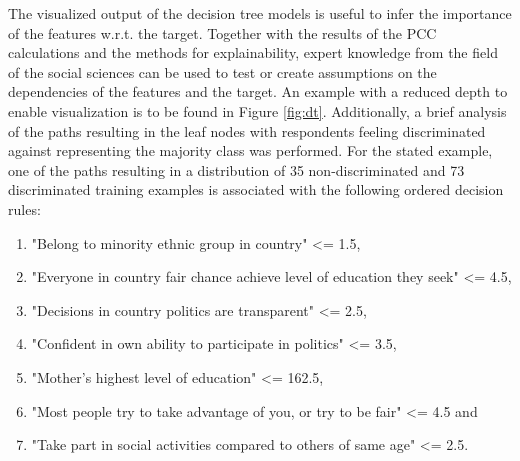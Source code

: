 \documentclass[10pt]{article}
\begin{document}
	The visualized output of the decision tree models is useful to infer the importance of the features w.r.t. the target. Together with the results of the PCC calculations and the methods for explainability, expert knowledge from the field of the social sciences can be used to test or create assumptions on the dependencies of the features and the target.
	An example with a reduced depth to enable visualization is to be found in Figure \ref{fig:dt}. Additionally, a brief analysis of the paths resulting in the leaf nodes with respondents feeling discriminated against representing the majority class was performed. For the stated example, one of the paths resulting in a distribution of 35 non-discriminated and 73 discriminated training examples is associated with the following ordered decision rules: 
	
	\begin{enumerate}
		\item "Belong to minority ethnic group in country" <= 1.5,
		\item "Everyone in country fair chance achieve level of education they seek" <= 4.5,
		\item "Decisions in country politics are transparent" <= 2.5,
		\item "Confident in own ability to participate in politics" <= 3.5,
		\item "Mother's highest level of education" <= 162.5,
		\item "Most people try to take advantage of you, or try to be fair" <= 4.5 and
		\item "Take part in social activities compared to others of same age" <= 2.5.
	\end{enumerate}
	
\end{document}
